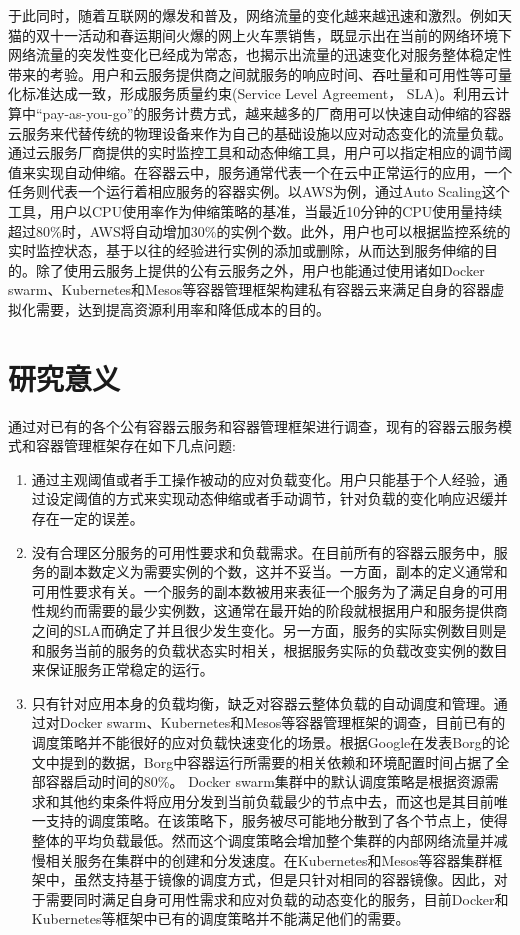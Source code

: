 于此同时，随着互联网的爆发和普及，网络流量的变化越来越迅速和激烈。例如天猫的双十一活动和春运期间火爆的网上火车票销售，既显示出在当前的网络环境下网络流量的突发性变化已经成为常态，也揭示出流量的迅速变化对服务整体稳定性带来的考验。用户和云服务提供商之间就服务的响应时间、吞吐量和可用性等可量化标准达成一致，形成服务质量约束(Service Level Agreement， SLA)\cite{patel2009service}。利用云计算中“pay-as-you-go”的服务计费方式\cite{armbrust2010view}，越来越多的厂商用可以快速自动伸缩的容器云服务来代替传统的物理设备来作为自己的基础设施以应对动态变化的流量负载。通过云服务厂商提供的实时监控工具和动态伸缩工具，用户可以指定相应的调节阈值来实现自动伸缩。在容器云中，服务通常代表一个在云中正常运行的应用，一个任务则代表一个运行着相应服务的容器实例。以AWS为例，通过Auto Scaling这个工具，用户以CPU使用率作为伸缩策略的基准，当最近10分钟的CPU使用量持续超过80\%时，AWS将自动增加30\%的实例个数。此外，用户也可以根据监控系统的实时监控状态，基于以往的经验进行实例的添加或删除，从而达到服务伸缩的目的。除了使用云服务上提供的公有云服务之外，用户也能通过使用诸如Docker swarm、Kubernetes和Mesos等容器管理框架构建私有容器云来满足自身的容器虚拟化需要，达到提高资源利用率和降低成本的目的。

\section{研究意义}
通过对已有的各个公有容器云服务和容器管理框架进行调查，现有的容器云服务模式和容器管理框架存在如下几点问题:
\begin{enumerate}
\item 通过主观阈值或者手工操作被动的应对负载变化。用户只能基于个人经验，通过设定阈值的方式来实现动态伸缩或者手动调节，针对负载的变化响应迟缓并存在一定的误差。
\item 没有合理区分服务的可用性要求和负载需求。在目前所有的容器云服务中，服务的副本数定义为需要实例的个数，这并不妥当。一方面，副本的定义通常和可用性要求有关。一个服务的副本数被用来表征一个服务为了满足自身的可用性规约而需要的最少实例数，这通常在最开始的阶段就根据用户和服务提供商之间的SLA而确定了并且很少发生变化\cite{beyer2016site}。另一方面，服务的实际实例数目则是和服务当前的服务的负载状态实时相关，根据服务实际的负载改变实例的数目来保证服务正常稳定的运行。
\item 只有针对应用本身的负载均衡，缺乏对容器云整体负载的自动调度和管理。通过对Docker swarm、Kubernetes和Mesos等容器管理框架的调查，目前已有的调度策略并不能很好的应对负载快速变化的场景。根据Google在发表Borg的论文中提到的数据，Borg中容器运行所需要的相关依赖和环境配置时间占据了全部容器启动时间的80\%\cite{verma2015large}。
Docker swarm集群中的默认调度策略是根据资源需求和其他约束条件将应用分发到当前负载最少的节点中去，而这也是其目前唯一支持的调度策略。在该策略下，服务被尽可能地分散到了各个节点上，使得整体的平均负载最低。然而这个调度策略会增加整个集群的内部网络流量并减慢相关服务在集群中的创建和分发速度。在Kubernetes和Mesos等容器集群框架中，虽然支持基于镜像的调度方式，但是只针对相同的容器镜像。因此，对于需要同时满足自身可用性需求和应对负载的动态变化的服务，目前Docker和Kubernetes等框架中已有的调度策略并不能满足他们的需要。
\end{enumerate}

